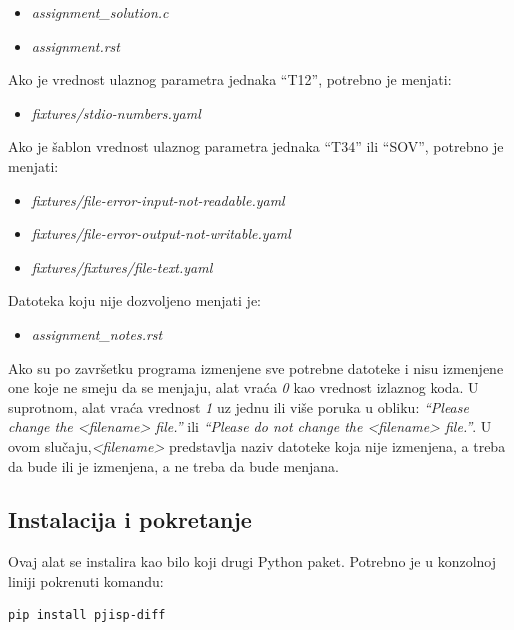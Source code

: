 \documentclass[12pt]{report}
\begin{document}
\begin{itemize}
    \item \textit{assignment\_solution.c}
    \item \textit{assignment.rst}
\end{itemize}

Ako je vrednost ulaznog parametra jednaka ``T12'', potrebno je menjati:

\begin{itemize}
    \item \textit{fixtures/stdio-numbers.yaml}
\end{itemize}

Ako je šablon vrednost ulaznog parametra jednaka ``T34'' ili ``SOV'', potrebno je menjati:

\begin{itemize}
    \item \textit{fixtures/file-error-input-not-readable.yaml}
    \item \textit{fixtures/file-error-output-not-writable.yaml}
    \item \textit{fixtures/fixtures/file-text.yaml}
\end{itemize}

Datoteka koju nije dozvoljeno menjati je:

\begin{itemize}
    \item \textit{assignment\_notes.rst}
\end{itemize}

Ako su po završetku programa izmenjene sve potrebne datoteke i nisu izmenjene one koje ne smeju da se menjaju, alat vraća \textit{0} kao vrednost izlaznog koda. U suprotnom, alat vraća vrednost \textit{1} uz jednu ili više poruka u obliku: \textit{``Please change the <filename> file.''} ili \textit{``Please do not change the <filename> file.''}. U ovom slučaju,\textit{<filename>} predstavlja naziv datoteke koja nije izmenjena, a treba da bude ili je izmenjena, a ne treba da bude menjana.

\subsection{Instalacija i pokretanje}
Ovaj alat se instalira kao bilo koji drugi Python paket. Potrebno je u konzolnoj liniji pokrenuti komandu:

\begin{verbatim}
pip install pjisp-diff
\end{verbatim}
\end{document}
